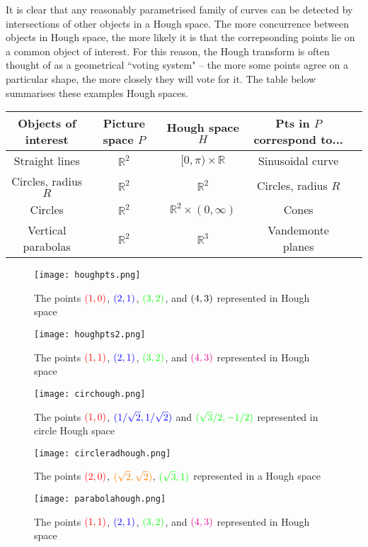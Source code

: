\documentclass[a4paper,11pt,twoside]{article}
\theoremstyle{definition}
\theoremstyle{remark}
\begin{document}
It is clear that any reasonably parametrised family of curves can be detected by intersections of other objects in a Hough space. The more concurrence between objects in Hough space, the more likely it is that the correpsonding points lie on a common object of interest. For this reason, the Hough transform is often thought of as a geometrical ``voting system" -- the more some points agree on a particular shape, the more closely they will vote for it. The table below summarises these examples Hough spaces.
\begin{center}
\begin{tabular}{|c|c|c|c|c}
Objects of interest & Picture space $P$ & Hough space $H$& Pts in $P$ correspond to... \\\hline
Straight lines & $\mathbb{R}^2$ & $[0,\pi)\times\mathbb{R}$ & Sinusoidal curve\\
Circles, radius $R$ & $\mathbb{R}^2$ & $\mathbb{R}^2$ & Circles, radius $R$\\
Circles & $\mathbb{R}^2$&$\mathbb{R}^2\times(0,\infty)$&Cones\\
Vertical parabolas&$\mathbb{R}^2$&$\mathbb{R}^3$&Vandemonte planes
\end{tabular}
\end{center}
\newpage
\begin{figure}[!h]
  \caption{The points $\color{red}(1,0)$, $\color{blue}(2,1)$, $\color{green}(3,2)$, and $\color{black}(4,3)$ represented in Hough space}
  \centering
    \texttt{[image: houghpts.png]}
    \label{houghpts}
\end{figure}
\begin{figure}[!h]
  \caption{The points $\color{red}(1,1)$, $\color{blue}(2,1)$, $\color{green}(3,2)$, and $\color{magenta}(4,3)$ represented in Hough space}
  \centering
    \texttt{[image: houghpts2.png]}
    \label{houghpts2}
\end{figure}
\newpage
\newpage
\begin{figure}[!h]
  \caption{The points $\color{red}(1,0)$, $\color{blue}(1/\sqrt{2},1/\sqrt{2})$ and $\color{green}(\sqrt{3}/2,-1/2)$ represented in circle Hough space}
  \centering
    \texttt{[image: circhough.png]}
    \label{circhough}
\end{figure}
\newpage
\begin{figure}[!h]
  \caption{The points $\color{red}(2,0)$, $\color{orange}(\sqrt{2},\sqrt{2})$, $\color{green}(\sqrt{3},1)$ represented in a Hough space}
  \centering
    \texttt{[image: circleradhough.png]}
    \label{circleradhough}
\end{figure}
\begin{figure}[!h]
  \caption{The points $\color{red}(1,1)$, $\color{blue}(2,1)$, $\color{green}(3,2)$, and $\color{magenta}(4,3)$ represented in Hough space}
  \centering
    \texttt{[image: parabolahough.png]}
    \label{parabolahough}
\end{figure}
\newpage
\end{document}
